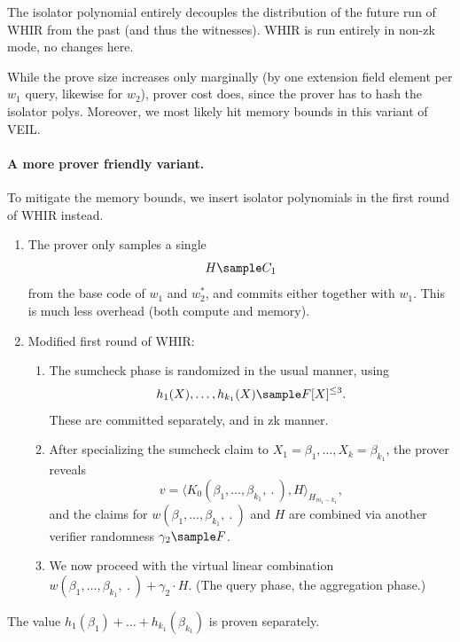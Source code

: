 The isolator polynomial entirely decouples the distribution of the future run of WHIR from the past (and thus the witnesses). 
WHIR is run entirely in non-zk mode, no changes here.

While the prove size increases only marginally (by one extension field element per $w_1$ query, likewise for $w_2$), prover cost does, since the prover has to hash the isolator polys. 
Moreover, we most likely hit memory bounds in this variant of VEIL.



\paragraph{A more prover friendly variant.}

To mitigate the memory bounds, we insert isolator polynomials in the first round of WHIR instead.

\begin{enumerate}
\item
The prover only samples a single
\[
H \sample C_1
\]
from the base code of $w_1$ and $w_2^*$, and commits either together with $w_1$. 
This is much less overhead (both compute and memory). 

\item 
Modified first round of WHIR:
\begin{enumerate}
\item
The sumcheck phase is randomized in the usual manner, using 
\[
h_1(X),\ldots, h_{k_1}(X)\sample F[X]^{\leq 3}.
\]
These are committed separately, and in zk manner. 

\item
After specializing the sumcheck claim to $X_1 = \beta_1,\ldots, X_k =\beta_{k_1}$, the prover reveals 
\[
v = \langle K_0(\beta_1,\ldots, \beta_{k_1}, \:.\:), H\rangle_{H_{m_1 - k_1}},
\]
and the claims for $w(\beta_1,\ldots, \beta_{k_1},\:.\:)$ and $H$ are combined via another verifier randomness $\gamma_2\sample F$.
\item 
We now proceed with the virtual linear combination $w(\beta_1,\ldots, \beta_{k_1}, \:.\:) + \gamma_2\cdot H$.
(The query phase, the aggregation phase.)
\end{enumerate}
\end{enumerate}

The value $h_1(\beta_1) +\ldots + h_{k_1}(\beta_{k_1})$ is proven separately. 